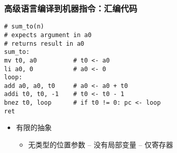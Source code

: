 %	
%	

\begin{frame}
\frametitle{高级语言编译到机器指令：\small{汇编代码}}

\small	
\centering
\begin{block}{}
\begin{verbatim}
# sum_to(n)
# expects argument in a0
# returns result in a0
sum_to:
mv t0, a0          # t0 <- a0
li a0, 0           # a0 <- 0
loop:
add a0, a0, t0     # a0 <- a0 + t0
addi t0, t0, -1    # t0 <- t0 - 1
bnez t0, loop      # if t0 != 0: pc <- loop
ret
\end{verbatim}
\end{block}

\begin{itemize}
	
	\item 有限的抽象
	\begin{itemize}
	  \item 无类型的位置参数 -- 没有局部变量 -- 仅寄存器
	\end{itemize}
		
\end{itemize}
	
\end{frame}

